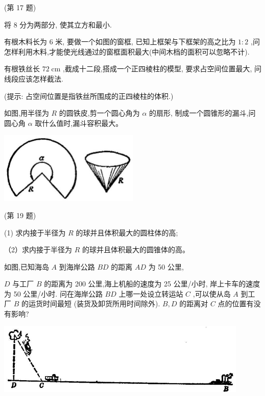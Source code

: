 \documentclass[lang=cn,newtx,12pt,scheme=chinese]{elegantbook}
\begin{document}
\begin{problemset}[习 题 十 一]
(第 17 题)

\item 将 8 分为两部分, 使其立方和最小.

\item 有根木料长为 6 米, 要做一个如图的窗框, 已知上框架与下框架的高之比为 \(1 : 2\) ,问怎样利用木料,才能使光线通过的窗框面积最大(中间木档的面积可以忽略不计).

\item 有根铁丝长 \({72}\mathrm{\;{cm}}\) ,截成十二段,搭成一个正四棱柱的模型, 要求占空间位置最大, 问线段应该怎样截法.

(提示: 占空间位置是指铁丝所围成的正四棱柱的体积.)

\item 如图,用半径为 \(R\) 的圆铁皮,剪一个圆心角为 \(\alpha\) 的扇形, 制成一个圆锥形的漏斗,问圆心角 \(\alpha\) 取什么值时,漏斗容积最大。

\begin{center}
\includegraphics[max width=0.5\textwidth]{images/01912c18-5c3f-733d-b775-749ba9897a9d_157_936491.jpg}
\end{center}

(第 19 题)

\item (1) 求内接于半径为 \(R\) 的球并且体积最大的圆柱体的高;

（2）求内接于半径为 \(R\) 的球并且体积最大的圆锥体的高。

\item 如图,已知海岛 \(A\) 到海岸公路 \({BD}\) 的距离 \({AD}\) 为 50 公里,

\(D\) 与工厂 \(B\) 的距离为 200 公里,海上机船的速度为 25 公里/小时, 岸上卡车的速度为 50 公里/小时. 问在海岸公路 \({BD}\) 上哪一处设立转运站 \(C\) ,可以使从岛 \(A\) 到工厂 \(B\) 的运货时间最短 (装货及卸货所用时间除外). \(B,D\) 的距离对 \(C\) 点的位置有没有影响?

\begin{center}
\includegraphics[max width=0.9\textwidth]{images/01912c18-5c3f-733d-b775-749ba9897a9d_158_569376.jpg}
\end{center}


\end{problemset}
\end{document}
